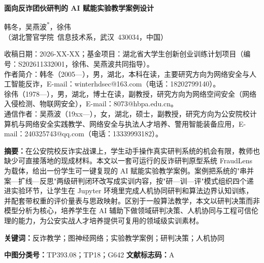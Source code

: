 \documentclass[12pt,a4paper]{ctexart}
\newif\ifanon
\begin{document}

\begin{center}
  \centerline{\heiti\bfseries 面向反诈团伙研判的 AI 赋能实验教学案例设计}\par\vspace{8pt}
  \ifanon
  \else
  { 韩冬，吴燕波\textsuperscript{*}，徐伟}\\[2pt]
  { （湖北警官学院~信息技术系，武汉~430034，中国）}
  \fi
\end{center}

\ifanon
\else
\vspace{4pt}
{\noindent
收稿日期：2026-XX-XX；基金项目：湖北省大学生创新创业训练计划项目（编号：S202611332001，徐伟、吴燕波共同指导）。\\
作者简介：韩冬（2005—），男，湖北，本科在读，主要研究方向为网络安全与人工智能反诈，E-mail：winterhdsec@163.com（电话：18202799140）。\\
徐伟（1978—），男，湖北，博士在读，副教授，研究方向为网络空间安全（网络入侵检测、物联网安全），E-mail：8073@hbpa.edu.cn。\\
通信作者：吴燕波（19xx—），女，湖北，硕士，副教授，研究方向为公安院校计算机与网络安全实践教学、网络安全与执法人才培养、警用智能装备应用，E-mail：240325743@qq.com（电话：13339993182）。}
\fi

\noindent\textbf{摘要：}在公安院校反诈实战课上，学生动手操作真实研判系统的机会有限，教师也缺少可直接落地的现成材料。本文以一套可运行的反诈研判原型系统 FraudLens 为载体，给出一份学生可一键复现的 AI 赋能实验教学案例。案例把系统的"串并案—扩线—反思"两级研判闭环改写成实训内容，按"研—训—评"模式组织四个递进实验环节，让学生在 Jupyter 环境里完成人机协同研判和算法边界认知训练，并配套带权重的评价量表与思政映射。区别于一般算法教学，本文以研判决策而非模型分析为核心，培养学生在 AI 辅助下做领域研判决策、人机协同与工程可信伦理的能力，为公安实战人才培养提供可复用的领域级实训素材。

\vspace{4pt}\noindent\textbf{关键词：}反诈教学；图神经网络；实验教学案例；研判决策；人机协同

\noindent\textbf{中图分类号：}TP393.08；TP18；G642 \qquad \textbf{文献标志码：}A
\end{document}
